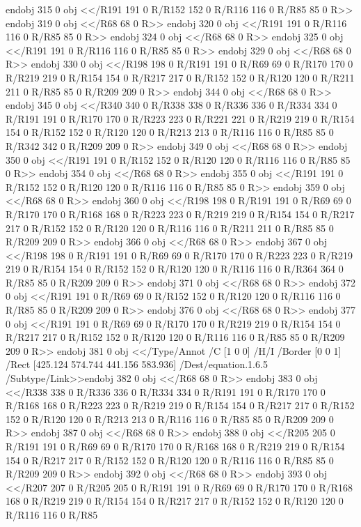 {{{{{{{{{{{{{{{{{{{{{{{{{{{{endobj
315 0 obj
<</R191
191 0 R/R152
152 0 R/R116
116 0 R/R85
85 0 R>>
endobj
319 0 obj
<</R68
68 0 R>>
endobj
320 0 obj
<</R191
191 0 R/R116
116 0 R/R85
85 0 R>>
endobj
324 0 obj
<</R68
68 0 R>>
endobj
325 0 obj
<</R191
191 0 R/R116
116 0 R/R85
85 0 R>>
endobj
329 0 obj
<</R68
68 0 R>>
endobj
330 0 obj
<</R198
198 0 R/R191
191 0 R/R69
69 0 R/R170
170 0 R/R219
219 0 R/R154
154 0 R/R217
217 0 R/R152
152 0 R/R120
120 0 R/R211
211 0 R/R85
85 0 R/R209
209 0 R>>
endobj
344 0 obj
<</R68
68 0 R>>
endobj
345 0 obj
<</R340
340 0 R/R338
338 0 R/R336
336 0 R/R334
334 0 R/R191
191 0 R/R170
170 0 R/R223
223 0 R/R221
221 0 R/R219
219 0 R/R154
154 0 R/R152
152 0 R/R120
120 0 R/R213
213 0 R/R116
116 0 R/R85
85 0 R/R342
342 0 R/R209
209 0 R>>
endobj
349 0 obj
<</R68
68 0 R>>
endobj
350 0 obj
<</R191
191 0 R/R152
152 0 R/R120
120 0 R/R116
116 0 R/R85
85 0 R>>
endobj
354 0 obj
<</R68
68 0 R>>
endobj
355 0 obj
<</R191
191 0 R/R152
152 0 R/R120
120 0 R/R116
116 0 R/R85
85 0 R>>
endobj
359 0 obj
<</R68
68 0 R>>
endobj
360 0 obj
<</R198
198 0 R/R191
191 0 R/R69
69 0 R/R170
170 0 R/R168
168 0 R/R223
223 0 R/R219
219 0 R/R154
154 0 R/R217
217 0 R/R152
152 0 R/R120
120 0 R/R116
116 0 R/R211
211 0 R/R85
85 0 R/R209
209 0 R>>
endobj
366 0 obj
<</R68
68 0 R>>
endobj
367 0 obj
<</R198
198 0 R/R191
191 0 R/R69
69 0 R/R170
170 0 R/R223
223 0 R/R219
219 0 R/R154
154 0 R/R152
152 0 R/R120
120 0 R/R116
116 0 R/R364
364 0 R/R85
85 0 R/R209
209 0 R>>
endobj
371 0 obj
<</R68
68 0 R>>
endobj
372 0 obj
<</R191
191 0 R/R69
69 0 R/R152
152 0 R/R120
120 0 R/R116
116 0 R/R85
85 0 R/R209
209 0 R>>
endobj
376 0 obj
<</R68
68 0 R>>
endobj
377 0 obj
<</R191
191 0 R/R69
69 0 R/R170
170 0 R/R219
219 0 R/R154
154 0 R/R217
217 0 R/R152
152 0 R/R120
120 0 R/R116
116 0 R/R85
85 0 R/R209
209 0 R>>
endobj
381 0 obj
<</Type/Annot
/C [1 0 0]
/H/I
/Border [0 0 1]
/Rect [425.124 574.744 441.156 583.936]
/Dest/equation.1.6.5
/Subtype/Link>>endobj
382 0 obj
<</R68
68 0 R>>
endobj
383 0 obj
<</R338
338 0 R/R336
336 0 R/R334
334 0 R/R191
191 0 R/R170
170 0 R/R168
168 0 R/R223
223 0 R/R219
219 0 R/R154
154 0 R/R217
217 0 R/R152
152 0 R/R120
120 0 R/R213
213 0 R/R116
116 0 R/R85
85 0 R/R209
209 0 R>>
endobj
387 0 obj
<</R68
68 0 R>>
endobj
388 0 obj
<</R205
205 0 R/R191
191 0 R/R69
69 0 R/R170
170 0 R/R168
168 0 R/R219
219 0 R/R154
154 0 R/R217
217 0 R/R152
152 0 R/R120
120 0 R/R116
116 0 R/R85
85 0 R/R209
209 0 R>>
endobj
392 0 obj
<</R68
68 0 R>>
endobj
393 0 obj
<</R207
207 0 R/R205
205 0 R/R191
191 0 R/R69
69 0 R/R170
170 0 R/R168
168 0 R/R219
219 0 R/R154
154 0 R/R217
217 0 R/R152
152 0 R/R120
120 0 R/R116
116 0 R/R85
}}}}}}}}}}}}}}}}}}}}}}}}}}}}
